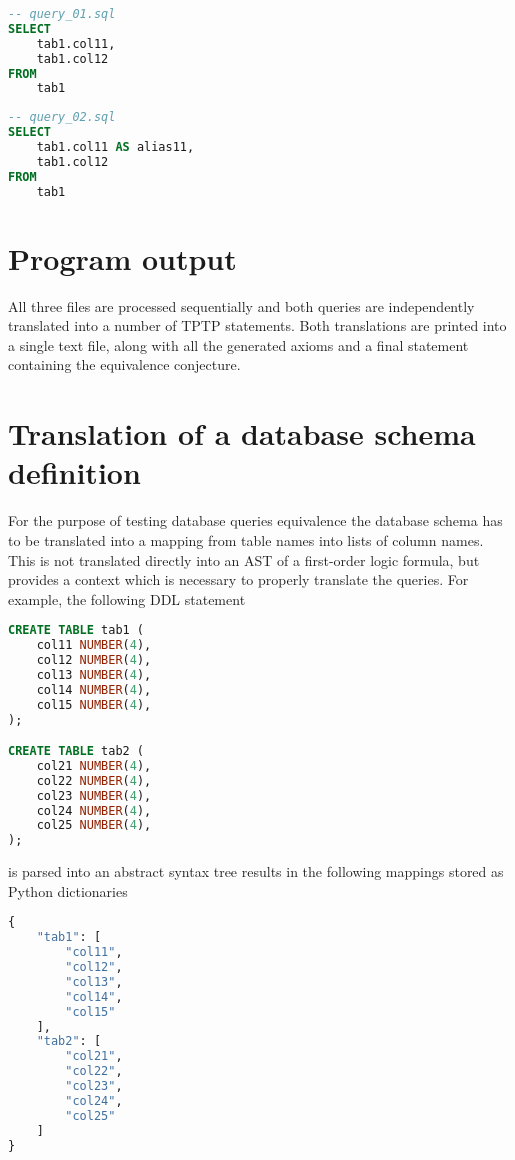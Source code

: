 \documentclass[magisterska,en]{pracamgr}
\begin{document}
\begin{lstlisting}[language=SQL]
-- query_01.sql
SELECT
    tab1.col11,
    tab1.col12
FROM
    tab1
\end{lstlisting}
\begin{lstlisting}[language=SQL]
-- query_02.sql
SELECT
    tab1.col11 AS alias11,
    tab1.col12
FROM
    tab1
\end{lstlisting}

\section{Program output}
All three files are processed sequentially and both queries are independently translated into a number of TPTP statements. Both translations are printed into a single text file, along with all the generated axioms and a final statement containing the equivalence conjecture.

\section{Translation of a database schema definition}

For the purpose of testing database queries equivalence the database schema has to be translated into a mapping from table names into lists of column names. This is not translated directly into an AST of a first-order logic formula, but provides a context which is necessary to properly translate the queries. For example, the following DDL statement

\begin{lstlisting}[language=SQL, caption=Sample database schema definition]
CREATE TABLE tab1 (
    col11 NUMBER(4),
    col12 NUMBER(4),
    col13 NUMBER(4),
    col14 NUMBER(4),
    col15 NUMBER(4),
);

CREATE TABLE tab2 (
    col21 NUMBER(4),
    col22 NUMBER(4),
    col23 NUMBER(4),
    col24 NUMBER(4),
    col25 NUMBER(4),
);
\end{lstlisting}

is parsed into an abstract syntax tree
results in the following mappings stored as Python dictionaries

\begin{lstlisting}[language=Python, caption=Database schema representation]
{
    "tab1": [
        "col11",
        "col12",
        "col13",
        "col14",
        "col15"
    ],
    "tab2": [
        "col21",
        "col22",
        "col23",
        "col24",
        "col25"
    ]
}

\end{lstlisting}
\end{document}
